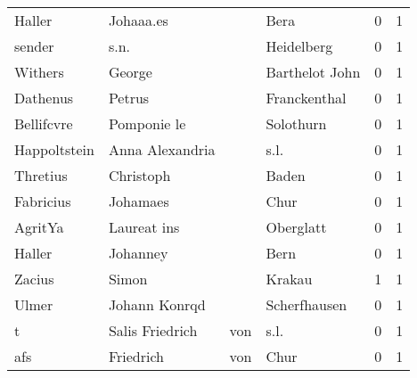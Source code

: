 \documentclass[10pt,a4paper,landscape]{article}
\begin{document}
\begin{longtable}{llllrr}
                   Haller &                          Johaaa.es &             &                                        Bera &          0 &         1 \\
                   sender &                               s.n. &             &                                  Heidelberg &          0 &         1 \\
                  Withers &                             George &             &                              Barthelot John &          0 &         1 \\
                 Dathenus &                             Petrus &             &                                Franckenthal &          0 &         1 \\
               Bellifcvre &                        Pomponie le &             &                                   Solothurn &          0 &         1 \\
             Happoltstein &                    Anna Alexandria &             &                                        s.l. &          0 &         1 \\
                 Thretius &                          Christoph &             &                                       Baden &          0 &         1 \\
                Fabricius &                           Johamaes &             &                                        Chur &          0 &         1 \\
                  AgritYa &                        Laureat ins &             &                                   Oberglatt &          0 &         1 \\
                   Haller &                           Johanney &             &                                        Bern &          0 &         1 \\
                   Zacius &                              Simon &             &                                      Krakau &          1 &         1 \\
                    Ulmer &                      Johann Konrqd &             &                                Scherfhausen &          0 &         1 \\
                        t &                    Salis Friedrich &         von &                                        s.l. &          0 &         1 \\
                      afs &                          Friedrich &         von &                                        Chur &          0 &         1 \\

\end{longtable}
\end{document}
